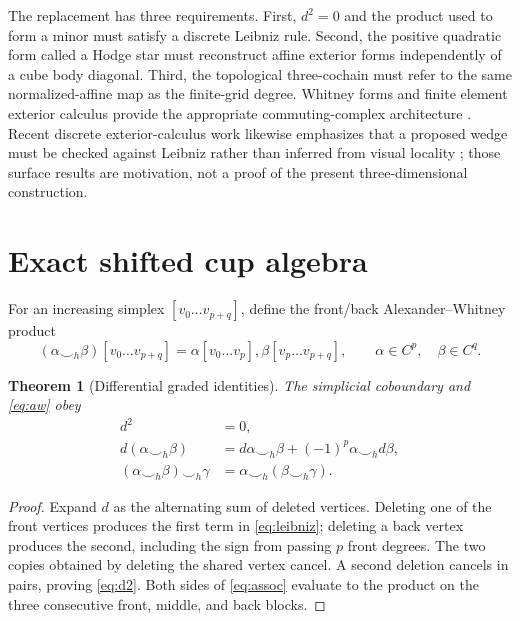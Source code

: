 \documentclass[11pt]{article}
\newtheorem{theorem}{Theorem}[section]
\newcommand{\cuph}{\smile_h}
\begin{document}
The replacement has three requirements.
First, $d^2=0$ and the product used to form a minor must satisfy a discrete
Leibniz rule.  Second, the positive quadratic form called a Hodge star must
reconstruct affine exterior forms independently of a cube body diagonal.
Third, the topological three-cochain must refer to the same normalized-affine
map as the finite-grid degree.  Whitney forms and finite element exterior
calculus provide the appropriate commuting-complex architecture
\cite{Whitney1957,Dodziuk1976,ArnoldFalkWinther2010}.  Recent discrete
exterior-calculus work likewise emphasizes that a proposed wedge must be
checked against Leibniz rather than inferred from visual locality
\cite{PtackovaVelho2024,Ptackova2025}; those surface results are motivation,
not a proof of the present three-dimensional construction.

\section{Exact shifted cup algebra}

For an increasing simplex $[v_0\ldots v_{p+q}]$, define the front/back
Alexander--Whitney product
\begin{equation}
 (\alpha\cuph\beta)[v_0\ldots v_{p+q}]
 =\alpha[v_0\ldots v_p],\beta[v_p\ldots v_{p+q}],
 \qquad \alpha\in C^p,\quad\beta\in C^q .
 \label{eq:aw}
\end{equation}

\begin{theorem}[Differential graded identities]
The simplicial coboundary and \eqref{eq:aw} obey
\begin{align}
 d^2&=0,\label{eq:d2}\\
 d(\alpha\cuph\beta)
 &=d\alpha\cuph\beta+(-1)^p\alpha\cuph d\beta,
 \label{eq:leibniz}\\
 (\alpha\cuph\beta)\cuph\gamma
 &=\alpha\cuph(\beta\cuph\gamma).
 \label{eq:assoc}
\end{align}
\end{theorem}

\begin{proof}
Expand $d$ as the alternating sum of deleted vertices.  Deleting one of the
front vertices produces the first term in \eqref{eq:leibniz}; deleting a
back vertex produces the second, including the sign from passing $p$
front degrees.  The two copies obtained by deleting the shared vertex cancel.
A second deletion cancels in pairs, proving \eqref{eq:d2}.  Both sides of
\eqref{eq:assoc} evaluate to the product on the three consecutive front,
middle, and back blocks.
\end{proof}
\end{document}
